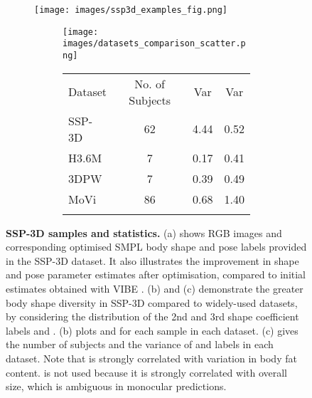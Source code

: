 \documentclass{bmvc2k}
\begin{document}
\begin{figure}[t]
     \centering
      \begin{subfigure}[c]{0.62\textwidth}
         \centering
         \texttt{[image: images/ssp3d\_examples\_fig.png]}
         \vspace{-0.5cm}
         \caption{}
         \label{fig:ssp3d_pre_post_optimisation_samples}
         \vspace{0.05cm}
     \end{subfigure}
     \hfill
     \begin{subfigure}[c]{0.37\textwidth}
         \begin{subfigure}[c]{\textwidth}
             \centering
             \texttt{[image: images/datasets\_comparison\_scatter.png]}
             \vspace{-0.6cm}
             \caption{}
             \label{fig:datasets_beta_scatter}
             \vspace{0.05cm}
         \end{subfigure}
         \begin{subfigure}[c]{\textwidth}
            \centering
            \renewcommand{\tabcolsep}{2.0pt}
            \scriptsize
            \begin{tabular}{l|c|c|c}
            \hline
            \noalign{\smallskip} 
            Dataset & No. of Subjects &  Var &  Var\\
            \noalign{\smallskip}
            \hline
            \noalign{\smallskip}
            SSP-3D & 62 & 4.44 & 0.52\\
            H3.6M \cite{h36m_pami}& 7 & 0.17 & 0.41\\
            3DPW \cite{vonMarcard2018} & 7 & 0.39 & 0.49\\
            MoVi \cite{movi2020} & 86 & 0.68 & 1.40\\
            \noalign{\smallskip}
            \hline
            \end{tabular}
            \vspace{-0.1cm}
            \caption{}
            \label{table:datasets_beta_var}
         \end{subfigure}
        \end{subfigure}
    \vspace{-0.4cm}
    \caption{\textbf{SSP-3D samples and statistics.} (a) shows RGB images and corresponding optimised SMPL body shape and pose labels provided in the SSP-3D dataset. It also illustrates the improvement in shape and pose parameter estimates after optimisation, compared to initial estimates obtained with VIBE \cite{kocabas2019vibe}. (b) and (c) demonstrate the greater body shape diversity in SSP-3D compared to widely-used datasets, by considering the distribution of the 2nd and 3rd shape coefficient labels  and . (b) plots  and  for each sample in each dataset. (c) gives the number of subjects and the variance of  and  labels in each dataset. Note that  is strongly correlated with variation in body fat content.  is not used because it is strongly correlated with overall size, which is ambiguous in monocular predictions.}
    \label{fig:ssp3d_samples_statistics}
\end{figure}
\end{document}
